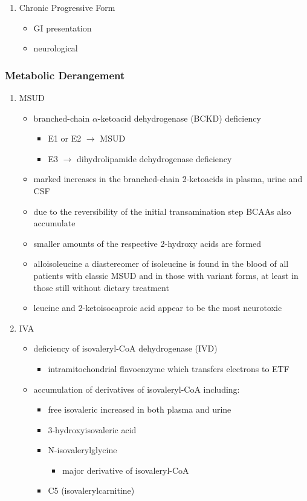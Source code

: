 \documentclass{scrartcl}
\begin{document}
\begin{enumerate}
\item Chronic Progressive Form
\label{sec:org66318aa}
\begin{itemize}
\item GI presentation
\item neurological
\end{itemize}
\end{enumerate}

\subsubsection{Metabolic Derangement}
\label{sec:org5d0b267}
\begin{enumerate}
\item MSUD
\label{sec:org4f4ac31}
\begin{itemize}
\item branched-chain \(\alpha\)-ketoacid dehydrogenase (BCKD) deficiency
\begin{itemize}
\item E1 or E2 \(\to\) MSUD
\item E3 \(\to\) dihydrolipamide dehydrogenase deficiency
\end{itemize}

\item marked increases in the branched-chain 2-ketoacids in plasma, urine
and CSF
\item due to the reversibility of the initial transamination step BCAAs
also accumulate
\item smaller amounts of the respective 2-hydroxy acids are formed
\item alloisoleucine a diastereomer of isoleucine is found in the blood of
all patients with classic MSUD and in those with variant forms, at
least in those still without dietary treatment
\item leucine and 2-ketoisocaproic acid appear to be the most neurotoxic
\end{itemize}

\item IVA
\label{sec:orga6bfb62}
\begin{itemize}
\item deficiency of isovaleryl-CoA dehydrogenase (IVD)
\begin{itemize}
\item intramitochondrial flavoenzyme which transfers electrons to ETF
\end{itemize}
\item accumulation of derivatives of isovaleryl-CoA including:
\begin{itemize}
\item free isovaleric increased in both plasma and urine
\item 3-hydroxyisovaleric acid
\item N-isovalerylglycine
\begin{itemize}
\item major derivative of isovaleryl-CoA
\end{itemize}
\item C5 (isovalerylcarnitine)
\end{itemize}
\end{itemize}


\end{enumerate}
\end{document}
